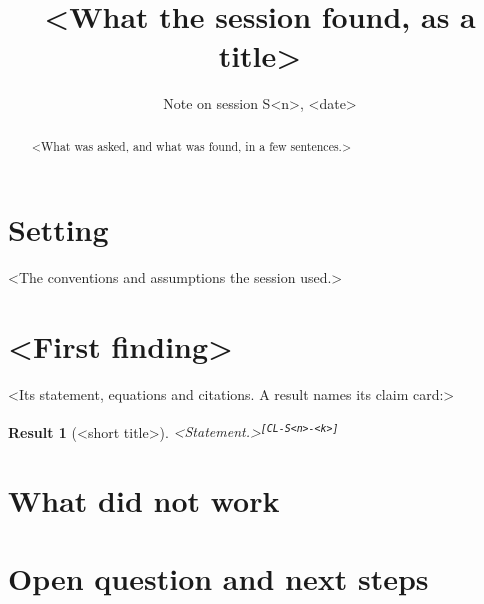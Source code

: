 \documentclass[11pt]{article}
\title{<What the session found, as a title>}
\author{Note on session S<n>, <date>}
\date{}
\newtheorem{result}{Result}
\newcommand{\card}[1]{\textsuperscript{\texttt{[#1]}}}
\begin{document}
\maketitle

\begin{abstract}
<What was asked, and what was found, in a few sentences.>
\end{abstract}

\section*{Setting}
<The conventions and assumptions the session used.>

\section{<First finding>}
<Its statement, equations and citations. A result names its claim card:>
\begin{result}[<short title>]
<Statement.>\card{CL-S<n>-<k>}
\end{result}

\section{What did not work}

\section{Open question and next steps}



\end{document}
